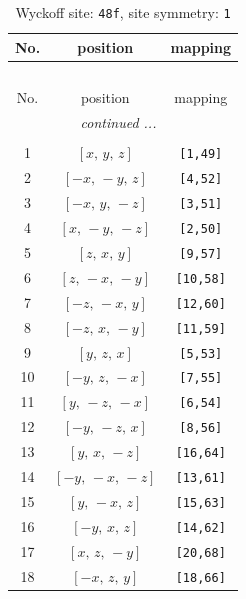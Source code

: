 \documentclass[fleqn,8pt]{jsarticle}
\begin{document}
\renewcommand{\arraystretch}{1.2}
\begin{longtable}{ccc}
\caption{Wyckoff site: {\tt 48f}, site symmetry: {\tt 1}}
 \\
 \hline \hline
No. & position & mapping \\ \hline \endfirsthead

\multicolumn{2}{l}{\tablename\ \thetable{}} \\
 \hline \hline
No. & position & mapping \\ \hline \endhead

 \hline \hline
\multicolumn{2}{r}{\footnotesize\it continued ...} \\ \endfoot

 \hline \hline
\multicolumn{2}{r}{} \\ \endlastfoot

1 & $\left[ x,\, y,\, z \right]$ & {\tt [1,49]} \\ \hline
2 & $\left[ - x,\, - y,\, z \right]$ & {\tt [4,52]} \\ \hline
3 & $\left[ - x,\, y,\, - z \right]$ & {\tt [3,51]} \\ \hline
4 & $\left[ x,\, - y,\, - z \right]$ & {\tt [2,50]} \\ \hline
5 & $\left[ z,\, x,\, y \right]$ & {\tt [9,57]} \\ \hline
6 & $\left[ z,\, - x,\, - y \right]$ & {\tt [10,58]} \\ \hline
7 & $\left[ - z,\, - x,\, y \right]$ & {\tt [12,60]} \\ \hline
8 & $\left[ - z,\, x,\, - y \right]$ & {\tt [11,59]} \\ \hline
9 & $\left[ y,\, z,\, x \right]$ & {\tt [5,53]} \\ \hline
10 & $\left[ - y,\, z,\, - x \right]$ & {\tt [7,55]} \\ \hline
11 & $\left[ y,\, - z,\, - x \right]$ & {\tt [6,54]} \\ \hline
12 & $\left[ - y,\, - z,\, x \right]$ & {\tt [8,56]} \\ \hline
13 & $\left[ y,\, x,\, - z \right]$ & {\tt [16,64]} \\ \hline
14 & $\left[ - y,\, - x,\, - z \right]$ & {\tt [13,61]} \\ \hline
15 & $\left[ y,\, - x,\, z \right]$ & {\tt [15,63]} \\ \hline
16 & $\left[ - y,\, x,\, z \right]$ & {\tt [14,62]} \\ \hline
17 & $\left[ x,\, z,\, - y \right]$ & {\tt [20,68]} \\ \hline
18 & $\left[ - x,\, z,\, y \right]$ & {\tt [18,66]} \\ \hline

\end{longtable}
\end{document}
